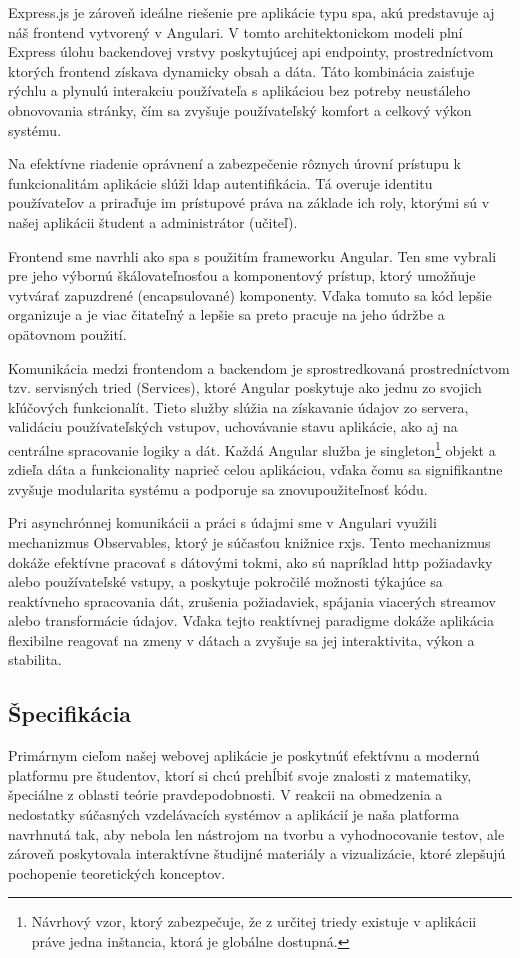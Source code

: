 Express.js je zároveň ideálne riešenie pre aplikácie typu \acrshort{spa}, akú predstavuje aj náš frontend vytvorený v Angulari. V tomto architektonickom modeli plní Express úlohu backendovej vrstvy poskytujúcej \acrshort{api} endpointy, prostredníctvom ktorých frontend získava dynamicky obsah a dáta. Táto kombinácia zaisťuje rýchlu a plynulú interakciu používateľa s aplikáciou bez potreby neustáleho obnovovania stránky, čím sa zvyšuje používateľský komfort a celkový výkon systému.

Na efektívne riadenie oprávnení a zabezpečenie rôznych úrovní prístupu k funkcionalitám aplikácie slúži \acrshort{ldap} autentifikácia. Tá overuje identitu používateľov a priraďuje im prístupové práva na základe ich roly, ktorými sú v našej aplikácii študent a administrátor (učiteľ). 

Frontend sme navrhli ako \acrfull{spa} s použitím frameworku Angular. Ten sme vybrali pre jeho výbornú škálovateľnosťou a komponentový prístup, ktorý umožňuje vytvárať zapuzdrené (encapsulované) komponenty. Vďaka tomuto sa kód lepšie organizuje a je viac čitateľný  a lepšie sa preto pracuje na jeho údržbe a opätovnom použití.

Komunikácia medzi frontendom a backendom je sprostredkovaná prostredníctvom tzv. servisných tried (Services), ktoré Angular poskytuje ako jednu zo svojich kľúčových funkcionalít. Tieto služby slúžia na získavanie údajov zo servera, validáciu používateľských vstupov, uchovávanie stavu aplikácie, ako aj na centrálne spracovanie logiky a dát. Každá Angular služba je singleton\footnote{Návrhový vzor, ktorý zabezpečuje, že z určitej triedy existuje v aplikácii práve jedna inštancia, ktorá je globálne dostupná.} objekt a zdieľa dáta a funkcionality naprieč celou aplikáciou, vďaka čomu sa signifikantne zvyšuje modularita systému a podporuje sa znovupoužiteľnosť kódu.

Pri asynchrónnej komunikácii a práci s údajmi sme v Angulari využili mechanizmus Observables, ktorý je súčasťou knižnice \acrshort{rxjs}. Tento mechanizmus dokáže efektívne pracovať s dátovými tokmi, ako sú napríklad \acrshort{http} požiadavky alebo používateľské vstupy, a poskytuje pokročilé možnosti týkajúce sa reaktívneho spracovania dát, zrušenia požiadaviek, spájania viacerých streamov alebo transformácie údajov. Vďaka tejto reaktívnej paradigme dokáže aplikácia flexibilne reagovať na zmeny v dátach a zvyšuje sa jej interaktivita, výkon a stabilita.


\subsection{Špecifikácia}
Primárnym cieľom našej webovej aplikácie je poskytnúť efektívnu a modernú platformu pre študentov, ktorí si chcú prehĺbiť svoje znalosti z matematiky, špeciálne z oblasti teórie pravdepodobnosti.
 V reakcii na obmedzenia a nedostatky súčasných vzdelávacích systémov a aplikácií je naša platforma navrhnutá tak, aby nebola len nástrojom na tvorbu a vyhodnocovanie testov, ale zároveň poskytovala interaktívne študijné materiály a vizualizácie, ktoré zlepšujú pochopenie teoretických konceptov.

